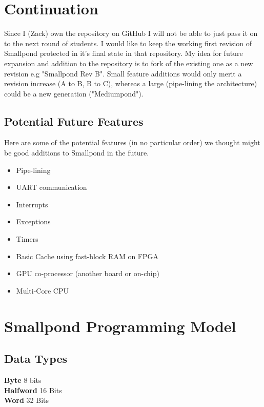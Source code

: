 \documentclass[12pt]{article}
\begin{document}
\section{Continuation}
Since I (Zack) own the repository on GitHub I will not be able to just pass it on to the next round of students. I would like to keep the working first revision of Smallpond protected in it's final state in that repository. My idea for future expansion and addition to the repository is to fork of the existing one as a new revision e.g "Smallpond Rev B". Small feature additions would only merit a revision increase (A to B, B to C), whereas a large (pipe-lining the architecture) could be a new generation ("Mediumpond").

    \subsection{Potential Future Features}
    Here are some of the potential features (in no particular order) we thought might be good additions to Smallpond in the future.\\
    \begin{itemize}
        \item Pipe-lining
        \item UART communication
        \item Interrupts
        \item Exceptions
        \item Timers
        \item Basic Cache using fast-block RAM on FPGA
        \item GPU co-processor (another board or on-chip)
        \item Multi-Core CPU
    \end{itemize}
    
\newpage

\section{Smallpond Programming Model}
    \subsection{Data Types}
    \textbf{Byte} \hspace{2cm}8 bits\\
    \textbf{Halfword} \hspace{1.05cm}16 Bits\\
    \textbf{Word} \hspace{1.8cm}32 Bits\\
    
\end{document}
